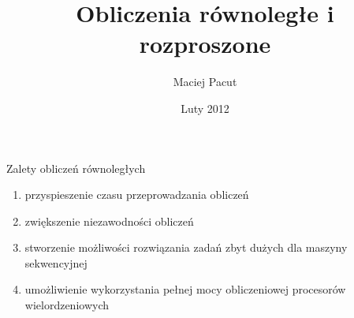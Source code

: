 \documentclass{beamer}
\title{Obliczenia równoległe i rozproszone}
\author{Maciej Pacut}
\date{Luty 2012}
\begin{document}
\maketitle

\begin{frame}{Zalety obliczeń równoległych}
  \begin{enumerate}
    \item przyspieszenie czasu przeprowadzania obliczeń
    \item zwiększenie niezawodności obliczeń
    \item stworzenie możliwości rozwiązania zadań zbyt dużych dla maszyny sekwencyjnej
    \item umożliwienie wykorzystania pełnej mocy obliczeniowej procesorów wielordzeniowych
  \end{enumerate}
\end{frame}
\end{document}
